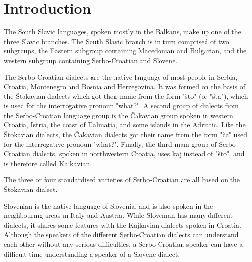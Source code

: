 \section{Introduction}

The South Slavic languages, spoken mostly in the Balkans, make up one of the three Slavic 
branches. The South Slavic branch is in turn comprised of two subgroups, the Eastern 
subgroup containing Macedonian and Bulgarian, and the western subgroup containing 
Serbo-Croatian and Slovene.

The Serbo-Croatian dialects are the native language of most people in Serbia, Croatia, 
Montenegro and Bosnia and Herzegovina. It was formed on the basis of the Štokavian dialects 
which got their name from the form "što" (or "šta"), which is used for the interrogative pronoun "what?". A second group of dialects from the Serbo-Croatian language group is the Čakavian group spoken in western Croatia, Istria, the coast of Dalmatia, and some islands in the Adriatic. Like the Štokavian dialects, the Čakavian dialects got their name from the form "ča" used for the interrogative pronoun "what?". Finally, the third main group of Serbo-Croatian dialects, spoken in northwestern Croatia, uses kaj instead of "što", and is therefore called Kajkavian.

The three or four standardised varieties of Serbo-Croatian are all based on the Štokavian dialect.

Slovenian is the native language of Slovenia, and is also spoken in the neighbouring areas in Italy and Austria. While Slovenian has many different dialects, it shares some features with the Kajkavian dialects spoken in Croatia. Although the speakers of the different Serbo-Croatian dialects can understand each other without any serious difficulties, a Serbo-Croatian speaker can have a difficult time understanding a speaker of a Slovene dialect.


\begin{figure}


\end{figure}

